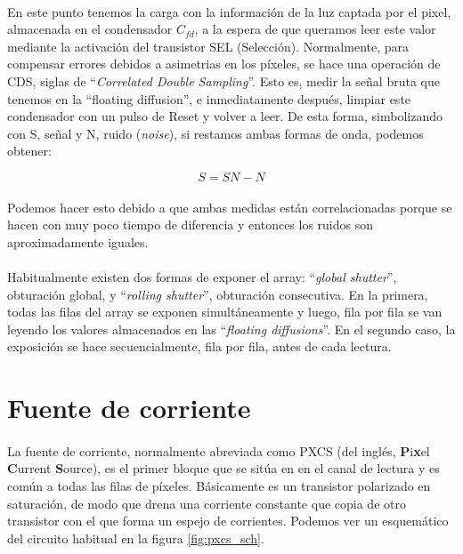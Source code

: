\paragraph{}
En este punto tenemos la carga con la información de la luz captada por el pixel,
almacenada en el condensador $C_{fd}$, a la espera de que queramos leer este valor
mediante la activación del transistor SEL (Selección). Normalmente, para compensar
errores debidos a asimetrias en los píxeles, se hace una operación de CDS, siglas de
``\textit{Correlated Double Sampling}''. Esto es, medir la señal bruta que tenemos
en la ``floating diffusion'', e inmediatamente después, limpiar este condensador con
un pulso de Reset y volver a leer. De esta forma, simbolizando con S, señal y N,
ruido (\textit{noise}), si restamos ambas formas de onda, podemos obtener:

\begin{equation}
	\label{eq:CDS_operation}
	S = SN - N
\end{equation}

\paragraph{}
Podemos hacer esto debido a que ambas medidas  están correlacionadas porque se
hacen con muy poco tiempo de diferencia y entonces los ruidos son aproximadamente
iguales.

\paragraph{}
Habitualmente existen dos formas de exponer el array: ``\textit{global shutter}'',
obturación global, y ``\textit{rolling shutter}'', obturación consecutiva. En la
primera, todas las filas del array se exponen simultáneamente y luego, fila por fila
se van leyendo los valores almacenados en las ``\textit{floating diffusions}''. En
el segundo caso, la exposición se hace secuencialmente, fila por fila, antes de cada
lectura.

\section{Fuente de corriente}\label{cap:ro_sch_pxcs}
\paragraph{}
La fuente de corriente, normalmente abreviada como PXCS (del inglés,
\textbf{P}i\textbf{x}el \textbf{C}urrent \textbf{S}ource),
es el primer bloque que se sitúa en
en el canal de lectura y es común a todas las filas de píxeles. Básicamente
es un transistor polarizado en saturación, de modo que drena una corriente
constante que copia de otro transistor con el que forma un espejo de corrientes.
Podemos ver un esquemático del circuito habitual en la figura \ref{fig:pxcs_sch}.

